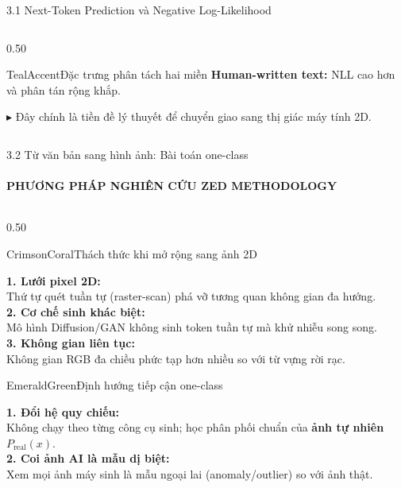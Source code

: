 \documentclass[aspectratio=169, 10pt, t]{beamer}
\begin{document}
\begin{frame}{3.1 Next-Token Prediction và Negative Log-Likelihood}
\begin{columns}[t]
\begin{column}{0.50\textwidth}
\begin{accentbox}[equal height group=math]{TealAccent}{Đặc trưng phân tách hai miền}
        \textbf{Human-written text:} NLL cao hơn và phân tán rộng khắp.
        \vspace{0.25em}

        $\blacktriangleright$ Đây chính là tiền đề lý thuyết để chuyển giao sang thị giác máy tính 2D.
      \end{accentbox}
    \end{column}
  \end{columns}
\end{frame}

\begin{frame}{3.2 Từ văn bản sang hình ảnh: Bài toán one-class}
  \framesubtitle{PHƯƠNG PHÁP NGHIÊN CỨU \;\textbar\; ZED METHODOLOGY}
  \begin{columns}[T, totalwidth=\linewidth]
    \begin{column}{0.50\linewidth}
      \begin{accentbox}[equal height group=s5box, top=0.5mm, bottom=0.5mm]{CrimsonCoral}{Thách thức khi mở rộng sang ảnh 2D}
        \raggedright\tiny
        \textbf{1. Lưới pixel 2D:}\\
        Thứ tự quét tuần tự (raster-scan) phá vỡ tương quan không gian đa hướng.\\
        \vspace{0.05em}
        \textbf{2. Cơ chế sinh khác biệt:}\\
        Mô hình Diffusion/GAN không sinh token tuần tự mà khử nhiễu song song.\\
        \vspace{0.05em}
        \textbf{3. Không gian liên tục:}\\
        Không gian RGB đa chiều phức tạp hơn nhiều so với từ vựng rời rạc.
      \end{accentbox}
      \vspace{0.06em}
      \begin{accentbox}[equal height group=s5box, top=0.5mm, bottom=0.5mm]{EmeraldGreen}{Định hướng tiếp cận one-class}
        \raggedright\tiny
        \textbf{1. Đổi hệ quy chiếu:}\\
        Không chạy theo từng công cụ sinh; học phân phối chuẩn của \textbf{ảnh tự nhiên} $P_{\text{real}}(x)$.\\
        \vspace{0.05em}
        \textbf{2. Coi ảnh AI là mẫu dị biệt:}\\
        Xem mọi ảnh máy sinh là mẫu ngoại lai (anomaly/outlier) so với ảnh thật.\\

\end{accentbox}
\end{column}
\end{columns}
\end{frame}
\end{document}
